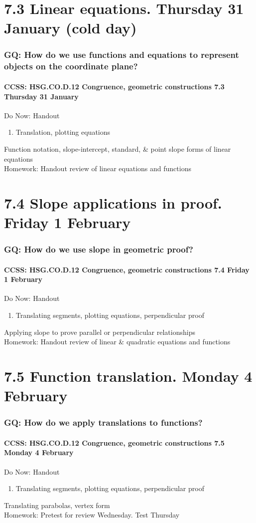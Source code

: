 \documentclass{beamer}
\begin{document}
\section{7.3 Linear equations. Thursday 31 January (cold day)}
  \frame
  {
    \frametitle{GQ: How do we use functions and equations to represent objects on the coordinate plane?}
    \framesubtitle{CCSS: HSG.CO.D.12 Congruence, geometric constructions  \alert{7.3 Thursday 31 January}}

    \begin{block}{Do Now: Handout}
      \begin{enumerate}
        \item Translation, plotting equations
      \end{enumerate}
    \end{block}
    Function notation, slope-intercept, standard, \& point slope forms of linear equations\\[0.5cm]
    Homework: Handout review of linear equations and functions
  }

\section{7.4 Slope applications in proof. Friday 1 February}
  \frame
  {
    \frametitle{GQ: How do we use slope in geometric proof?}
    \framesubtitle{CCSS: HSG.CO.D.12 Congruence, geometric constructions  \alert{7.4 Friday 1 February}}

    \begin{block}{Do Now: Handout}
      \begin{enumerate}
        \item Translating segments, plotting equations, perpendicular proof
      \end{enumerate}
    \end{block}
    Applying slope to prove parallel or perpendicular relationships\\[0.5cm]
    Homework: Handout review of linear \& quadratic equations and functions
  }

  \section{7.5 Function translation. Monday 4 February}
    \frame
    {
      \frametitle{GQ: How do we apply translations to functions?}
      \framesubtitle{CCSS: HSG.CO.D.12 Congruence, geometric constructions \hfill \alert{7.5 Monday 4 February}}

      \begin{block}{Do Now: Handout}
        \begin{enumerate}
          \item Translating segments, plotting equations, perpendicular proof
        \end{enumerate}
      \end{block}
      Translating parabolas, vertex form\\[0.5cm]
      Homework: Pretest for review Wednesday. \alert{Test Thursday}
    }
\end{document}
